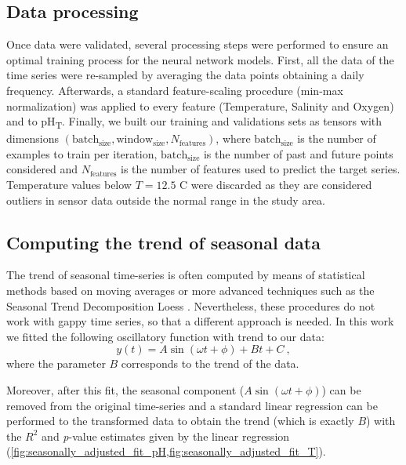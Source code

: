 \subsection{Data processing}

Once data were validated, several processing steps were performed to ensure
an optimal training process for the neural network models. First, all the data
of the time series were re-sampled by averaging the data points obtaining a
daily frequency. Afterwards, a standard feature-scaling procedure (min-max
normalization) was applied to every feature (Temperature, Salinity and Oxygen)
and to pH\textsubscript{T}. Finally, we built our training and validations sets
as tensors with dimensions $(\textrm{batch}_\textrm{size},
    \textrm{window}_\textrm{size}, N_{\textrm{features}})$,  where
$\textrm{batch}_\textrm{size}$ is the number of examples to train per
iteration, $\textrm{batch}_\textrm{size}$ is the number of past and future
points considered and $N_{\textrm{features}}$ is the number of features used to
predict the target series. Temperature values below $T=12.5$ \textdegree C were
discarded as they are considered outliers in sensor data outside the normal
range in the study area.

\subsection{Computing the trend of seasonal data}

The trend of seasonal time-series is often computed by means of statistical
methods based on moving averages or more advanced techniques such as the
Seasonal Trend Decomposition Loess \cite{cleveland1990stl}. Nevertheless, these
procedures do not work with gappy time series, so that a different approach is
needed. In this work we fitted the following oscillatory function with trend to
our data:
\begin{equation}\label{eq:seasonal_fit}
    y(t)=A\sin(\omega t+\phi)+Bt+C \ ,
\end{equation}
where the parameter $B$ corresponds to the trend of the data.

Moreover, after this fit, the seasonal component ($A\sin(\omega t + \phi)$)
can be removed from the original time-series and a standard linear regression
can be performed to the transformed data to obtain the trend (which is exactly
$B$) with the $R^2$ and \emph{p}-value estimates given by the linear regression
(\cref{fig:seasonally_adjusted_fit_pH,fig:seasonally_adjusted_fit_T}).

